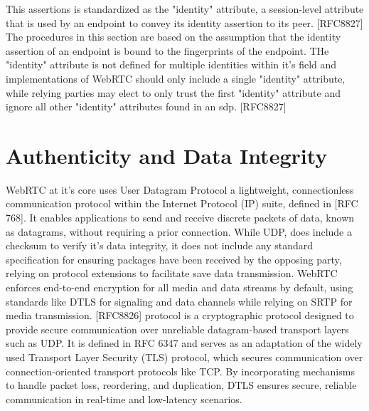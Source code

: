 \documentclass[conference]{IEEEtran}
\begin{document}
This assertions is standardized as the "identity" attribute, a session-level attribute that is used by an endpoint to 
convey its identity assertion to its peer. [RFC8827]
The procedures in this section are based on the assumption that the identity assertion 
of an endpoint is bound to the fingerprints of the endpoint. THe "identity" attribute
is not defined for multiple identities within it's field and implementations of WebRTC
should only include a single "identity" attribute, while relying parties may elect to
only trust the first "identity" attribute and ignore all other "identity" attributes
found in an sdp. [RFC8827]

\section{Authenticity and Data Integrity}
WebRTC at it's core uses User Datagram Protocol a lightweight, connectionless communication protocol 
within the Internet Protocol (IP) suite, defined in [RFC 768]. It enables applications to send and receive 
discrete packets of data, known as datagrams, without requiring a prior connection. While UDP, does
include a checksum to verify it's data integrity, it does not include any standard specification for ensuring
packages have been received by the opposing party, relying on protocol extensions to facilitate save
data transmission.
WebRTC enforces end-to-end encryption for all media and data streams by default, using 
standards like DTLS for signaling and data channels while relying on SRTP for media transmission. [RFC8826]
protocol is a cryptographic protocol designed to provide secure communication over unreliable datagram-based 
transport layers such as UDP. It is defined in RFC 6347 and serves as an adaptation of the widely used Transport 
Layer Security (TLS) protocol, which secures communication over connection-oriented transport protocols like TCP. 
By incorporating mechanisms to handle packet loss, reordering, and duplication, DTLS ensures secure, reliable 
communication in real-time and low-latency scenarios. %
\end{document}
